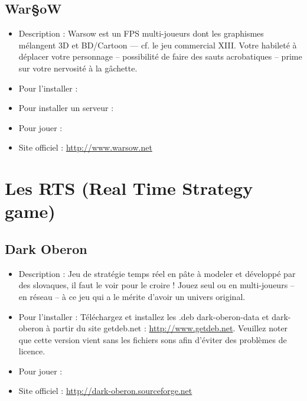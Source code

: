 \subsection{War§oW}
\begin{itemize}
\begingroup
{}
\item Description : Warsow est un FPS multi-joueurs dont les graphismes mélangent 3D et BD/Cartoon --- cf. le jeu commercial XIII. Votre habileté à déplacer votre personnage -- possibilité de faire des sauts acrobatiques -- prime sur votre nervosité à la gâchette.{\par}
\endgroup
\item Pour l'installer : 
\item Pour installer un serveur : 
\item Pour jouer : 
\item Site officiel : \url{http://www.warsow.net}{\par}
\end{itemize}
\section{Les RTS (Real Time Strategy game)}
\subsection{Dark Oberon}
\begin{itemize}
\begingroup
{}
\item Description : Jeu de stratégie temps réel en pâte à modeler et développé par des slovaques, il faut le voir pour le croire ! Jouez seul ou en multi-joueurs -- en réseau -- à ce jeu qui a le mérite d'avoir un univers original.{\par}
\endgroup
\item Pour l'installer : Téléchargez et installez les .deb dark-oberon-data et dark-oberon à partir du site getdeb.net :
\url{http://www.getdeb.net}. Veuillez noter que cette version vient sans les fichiers sons afin d'éviter des problèmes de licence.{\par}
\item Pour jouer : 
\item Site officiel : \url{http://dark-oberon.sourceforge.net}{\par}
\end{itemize}
